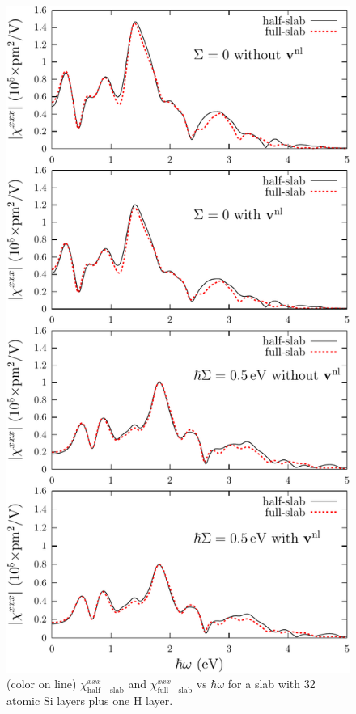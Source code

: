 \documentclass[floatfix,prb,aps,superscriptaddress,showpacs,letterpaper]{revtex4}
\begin{document}
\begin{figure}
\centering 
\includegraphics[scale=.8]{plots/fig2}
\caption{(color on line) 
$\chi^{xxx}_{\mathrm{half-slab}}$
and 
$\chi^{xxx}_{\mathrm{full-slab}}$
vs $\hbar\omega$ for a slab with 32 
atomic Si layers plus one H layer. 
\label{fig2}} 
\end{figure}
\end{document}
